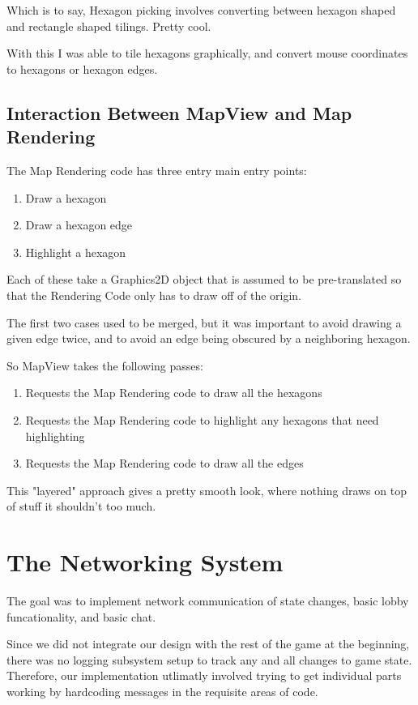 \documentclass[12pt,a4paper]{article}
\begin{document}
Which is to say, Hexagon picking involves converting between hexagon shaped
and rectangle shaped tilings. Pretty cool.

With this I was able to tile hexagons graphically, and convert mouse coordinates
to hexagons or hexagon edges.

\subsection{Interaction Between MapView and Map Rendering}

The Map Rendering code has three entry main entry points:
\begin{enumerate}
\item{Draw a hexagon}
\item{Draw a hexagon edge}
\item{Highlight a hexagon}
\end{enumerate}

Each of these take a Graphics2D object that is assumed to be pre-translated so
that the Rendering Code only has to draw off of the origin.

The first two cases used to be merged, but it was important to avoid drawing a
given edge twice, and to avoid an edge being obscured by a neighboring hexagon.

So MapView takes the following passes:
\begin{enumerate}
\item{Requests the Map Rendering code to draw all the hexagons}
\item{Requests the Map Rendering code to highlight any hexagons that need highlighting}
\item{Requests the Map Rendering code to draw all the edges}
\end{enumerate}

This "layered" approach gives a pretty smooth look, where nothing draws on top
of stuff it shouldn't too much.
\section{The Networking System}

The goal was to implement network communication of state changes, basic lobby funcationality, and basic chat. 

Since we did not integrate our design with the rest of the game at the beginning, there was no logging subsystem setup to track any and all 
changes to game state. Therefore, our implementation utlimatly involved trying to get individual parts working by hardcoding messages in
the requisite areas of code.
\end{document}
